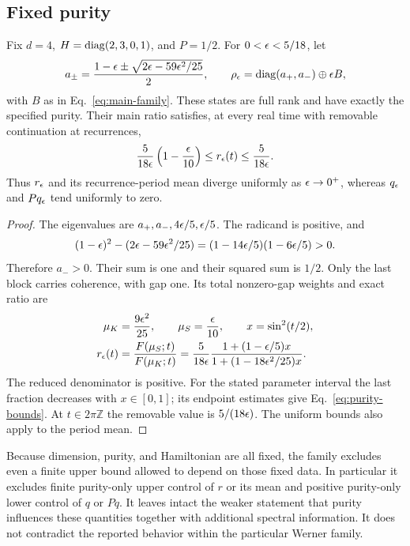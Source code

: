 \subsection{Fixed purity}
\begin{theorem}\label{thm:purity}
Fix $d=4$, $H=\operatorname{diag}(2,3,0,1)$, and $P=1/2$. For $0<\epsilon<5/18$, let
\begin{equation}\label{eq:purity-family}
 a_\pm=\frac{1-\epsilon\pm\sqrt{2\epsilon-59\epsilon^2/25}}2,
 \qquad \rho_\epsilon=\operatorname{diag}(a_+,a_-)\oplus\epsilon B,
\end{equation}
with $B$ as in Eq.~\eqref{eq:main-family}. These states are full rank and
have exactly the specified purity. Their main ratio satisfies, at every
real time with removable continuation at recurrences,
\begin{equation}\label{eq:purity-bounds}
 \frac5{18\epsilon}\left(1-\frac{\epsilon}{10}\right)
 \le r_\epsilon(t)\le\frac5{18\epsilon}.
\end{equation}
Thus $r_\epsilon$ and its recurrence-period mean diverge uniformly as
$\epsilon\to0^+$, whereas $q_\epsilon$ and $Pq_\epsilon$ tend uniformly to zero.
\end{theorem}
\begin{proof}
The eigenvalues are $a_+,a_-,4\epsilon/5,\epsilon/5$. The radicand is positive,
and
\begin{equation}\label{eq:purity-positive}
 (1-\epsilon)^2-(2\epsilon-59\epsilon^2/25)
 =(1-14\epsilon/5)(1-6\epsilon/5)>0.
\end{equation}
Therefore $a_->0$. Their sum is one and their squared sum is $1/2$.
Only the last block carries coherence, with gap one. Its total
nonzero-gap weights and exact ratio are
\begin{equation}\label{eq:purity-ratio}
 \begin{aligned}
 \mu_K&=\frac{9\epsilon^2}{25},\qquad \mu_S=\frac{\epsilon}{10},
 \qquad x=\sin^2(t/2),\\
 r_\epsilon(t)&=\frac{F(\mu_S;t)}{F(\mu_K;t)}
 =\frac5{18\epsilon}
 \frac{1+(1-\epsilon/5)x}{1+(1-18\epsilon^2/25)x}.
 \end{aligned}
\end{equation}
The reduced denominator is positive. For the stated parameter interval
the last fraction decreases with $x\in[0,1]$; its endpoint estimates
give Eq.~\eqref{eq:purity-bounds}. At $t\in2\pi\mathbb Z$ the removable
value is $5/(18\epsilon)$. The uniform bounds also apply to the period mean.
\end{proof}

Because dimension, purity, and Hamiltonian are all fixed, the family
excludes even a finite upper bound allowed to depend on those fixed data.
In particular it excludes finite purity-only upper control of $r$ or its
mean and positive purity-only lower control of $q$ or $Pq$.
It leaves intact the weaker statement that purity influences these
quantities together with additional spectral information. It does not
contradict the reported behavior within the particular Werner family.
